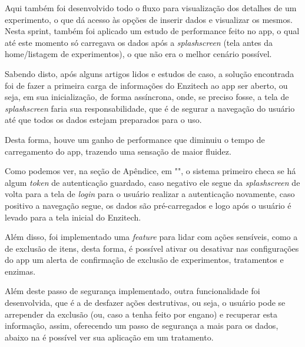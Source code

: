 Aqui também foi desenvolvido todo o fluxo para visualização dos detalhes de um experimento, o que dá acesso às opções de inserir dados e visualizar os mesmos. Nesta sprint, também foi aplicado um estudo de performance feito no \ac{app}, o qual até este momento só carregava os dados após a \textit{splashscreen} (tela antes da home/listagem de experimentos), o que não era o melhor cenário possível.

Sabendo disto, após alguns artigos lidos e estudos de caso, a solução encontrada foi de fazer a primeira carga de informações do Enzitech ao \ac{app} ser aberto, ou seja, em sua inicialização, de forma assíncrona, onde, se preciso fosse, a tela de \textit{splashscreen} faria sua responsabilidade, que é de segurar a navegação do usuário até que todos os dados estejam preparados para o uso. 

Desta forma, houve um ganho de performance que diminuiu o tempo de carregamento do \ac{app}, trazendo uma sensação de maior fluidez.

Como podemos ver, na seção de Apêndice, em "", o sistema primeiro checa se há algum \textit{token} de autenticação guardado, caso negativo ele segue da \textit{splashscreen} de volta para a tela de \textit{login} para o usuário realizar a autenticação novamente, caso positivo a navegação segue, os dados são pré-carregados e logo após o usuário é levado para a tela inicial do Enzitech.

Além disso, foi implementado uma \textit{feature} para lidar com ações sensíveis, como a de exclusão de itens, desta forma, é possível ativar ou desativar nas configurações do \ac{app} um alerta de confirmação de exclusão de experimentos, tratamentos e enzimas.

Além deste passo de segurança implementado, outra funcionalidade foi desenvolvida, que é a de desfazer ações destrutivas, ou seja, o usuário pode se arrepender da exclusão (ou, caso a tenha feito por engano) e recuperar esta informação, assim, oferecendo um passo de segurança a mais para os dados, abaixo na  é possível ver sua aplicação em um tratamento.

